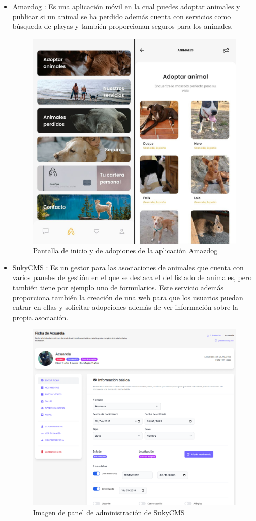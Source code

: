 \begin{itemize}
	\item Amazdog \cite{amazdog}: Es una aplicación móvil en la cual puedes adoptar animales y publicar si un animal se ha perdido además cuenta con servicios como búsqueda de playas y también proporcionan seguros para los animales.
	
\begin{figure}[H]
	\centering
	\includegraphics[width=0.7\linewidth]{"Sprint 0/amazdog"}
	\caption{Pantalla de inicio y de adopiones de la aplicación Amazdog}
	\label{fig:amazdog}
\end{figure}
	
	\item SukyCMS \cite{sukycms}: Es un gestor para las asociaciones de animales que cuenta con varios paneles de gestión en el que se destaca el del listado de animales, pero también tiene por ejemplo uno de formularios. Este servicio además proporciona también la creación de una web para que los usuarios puedan entrar en ellas y solicitar adopciones además de ver información sobre la propia asociación.
	
	
\begin{figure} [H]
	\centering
	\includegraphics[width=0.7\linewidth]{"Sprint 0/sukycms"}
	\caption{Imagen de panel de administración de SukyCMS}
	\label{fig:sukycms}
\end{figure}
	

\end{itemize}
